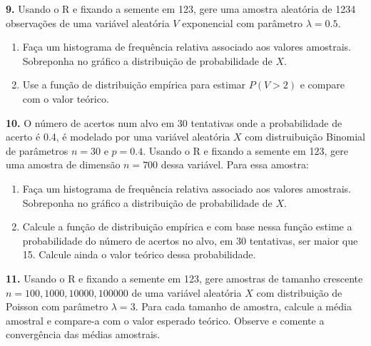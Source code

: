 \documentclass[
]{book}
\begin{document}
\textbf{9.} Usando o R e fixando a semente em 123, gere uma amostra aleatória
de 1234 observações de uma variável aleatória \(V\) exponencial com
parâmetro \(\lambda = 0.5\).

\begin{enumerate}
\def\labelenumi{(\alph{enumi})}
\item
  Faça um histograma de frequência relativa associado aos valores
  amostrais. Sobreponha no gráfico a distribuição de probabilidade de \(X\).
\item
  Use a função de distribuição empírica para estimar \(P(V > 2)\) e
  compare com o valor teórico.
\end{enumerate}

\textbf{10.} O número de acertos num alvo em 30 tentativas onde a
probabilidade de acerto é 0.4, é modelado por uma variável aleatória \(X\)
com distruibuição Binomial de parâmetros \(n=30\) e \(p=0.4\). Usando o R e
fixando a semente em 123, gere uma amostra de dimensão \(n=700\) dessa
variável. Para essa amostra:

\begin{enumerate}
\def\labelenumi{(\alph{enumi})}
\item
  Faça um histograma de frequência relativa associado aos valores
  amostrais. Sobreponha no gráfico a distribuição de probabilidade de \(X\).
\item
  Calcule a função de distribuição empírica e com base nessa
  função estime a probabilidade do número de acertos no alvo, em 30
  tentativas, ser maior que 15. Calcule ainda o valor teórico dessa
  probabilidade.
\end{enumerate}

\textbf{11.} Usando o R e fixando a semente em 123, gere amostras de tamanho
crescente \(n = 100, 1000, 10000, 100000\) de uma variável aleatória \(X\)
com distribuição de Poisson com parâmetro \(\lambda = 3\). Para cada
tamanho de amostra, calcule a média amostral e compare-a com o valor
esperado teórico. Observe e comente a convergência das médias amostrais.
\end{document}
